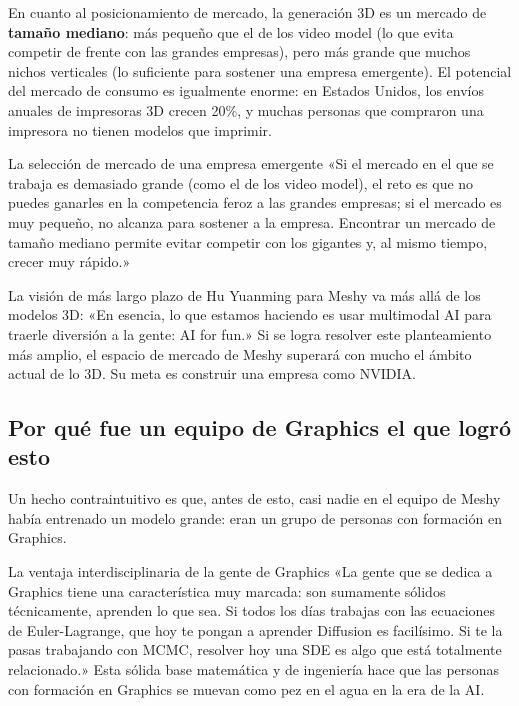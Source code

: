 En cuanto al posicionamiento de mercado, la generación 3D es un mercado de \textbf{tamaño mediano}: más pequeño que el de los video model (lo que evita competir de frente con las grandes empresas), pero más grande que muchos nichos verticales (lo suficiente para sostener una empresa emergente). El potencial del mercado de consumo es igualmente enorme: en Estados Unidos, los envíos anuales de impresoras 3D crecen 20\%, y muchas personas que compraron una impresora no tienen modelos que imprimir.

\begin{warningbox}{La selección de mercado de una empresa emergente}
«Si el mercado en el que se trabaja es demasiado grande (como el de los video model), el reto es que no puedes ganarles en la competencia feroz a las grandes empresas; si el mercado es muy pequeño, no alcanza para sostener a la empresa. Encontrar un mercado de tamaño mediano permite evitar competir con los gigantes y, al mismo tiempo, crecer muy rápido.»
\end{warningbox}

La visión de más largo plazo de Hu Yuanming para Meshy va más allá de los modelos 3D: «En esencia, lo que estamos haciendo es usar multimodal AI para traerle diversión a la gente: AI for fun.» Si se logra resolver este planteamiento más amplio, el espacio de mercado de Meshy superará con mucho el ámbito actual de lo 3D. Su meta es construir una empresa como NVIDIA.

\subsection{Por qué fue un equipo de Graphics el que logró esto}

Un hecho contraintuitivo es que, antes de esto, casi nadie en el equipo de Meshy había entrenado un modelo grande: eran un grupo de personas con formación en Graphics.

\begin{knowledgebox}{La ventaja interdisciplinaria de la gente de Graphics}
«La gente que se dedica a Graphics tiene una característica muy marcada: son sumamente sólidos técnicamente, aprenden lo que sea. Si todos los días trabajas con las ecuaciones de Euler-Lagrange, que hoy te pongan a aprender Diffusion es facilísimo. Si te la pasas trabajando con MCMC, resolver hoy una SDE es algo que está totalmente relacionado.» Esta sólida base matemática y de ingeniería hace que las personas con formación en Graphics se muevan como pez en el agua en la era de la AI.
\end{knowledgebox}

